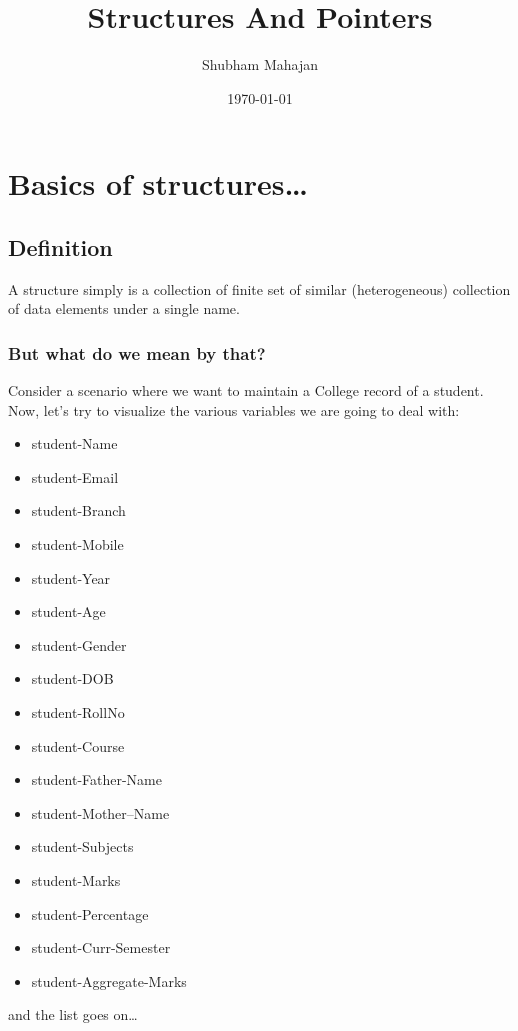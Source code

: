 \documentclass[11pt]{article}
\author{Shubham Mahajan}
\date{\today}
\title{Structures And Pointers}
\begin{document}
\maketitle
\tableofcontents


\section{Basics of structures…}
\label{sec:org63b4c42}

\subsection{Definition}
\label{sec:orge6a208a}

A structure simply is a collection of finite set of similar (heterogeneous)
collection of data elements under a single name.

\subsubsection{But what do we mean by that?}
\label{sec:org6e25ee4}

Consider a scenario where we want to maintain a College record of a student.
Now, let’s try to visualize the various variables we are going to deal with:

\begin{itemize}
\item student-Name
\item student-Email
\item student-Branch
\item student-Mobile
\item student-Year
\item student-Age
\item student-Gender
\item student-DOB
\item student-RollNo
\item student-Course
\item student-Father-Name
\item student-Mother–Name
\item student-Subjects
\item student-Marks
\item student-Percentage
\item student-Curr-Semester
\item student-Aggregate-Marks
\end{itemize}

and the list goes on…
\end{document}
